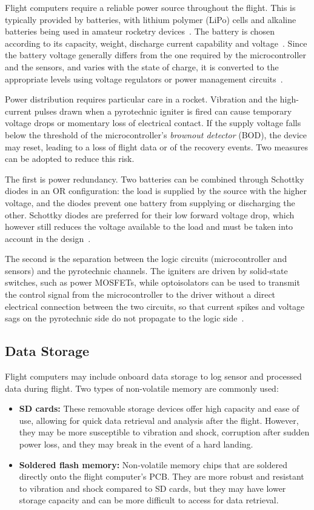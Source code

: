 Flight computers require a reliable power source throughout the flight. This is typically provided by batteries, with lithium polymer (LiPo) cells and alkaline batteries being used in amateur rocketry devices~\cite{altus:telemetrum,featherweight:blueraven}. The battery is chosen according to its capacity, weight, discharge current capability and voltage~\cite{reddy2011linden}. Since the battery voltage generally differs from the one required by the microcontroller and the sensors, and varies with the state of charge, it is converted to the appropriate levels using voltage regulators or power management circuits~\cite{horowitz2015art}.

Power distribution requires particular care in a rocket. Vibration and the high-current pulses drawn when a pyrotechnic igniter is fired can cause temporary voltage drops or momentary loss of electrical contact. If the supply voltage falls below the threshold of the microcontroller's \emph{brownout detector} (BOD), the device may reset, leading to a loss of flight data or of the recovery events. Two measures can be adopted to reduce this risk.

The first is power redundancy. Two batteries can be combined through Schottky diodes in an OR configuration: the load is supplied by the source with the higher voltage, and the diodes prevent one battery from supplying or discharging the other. Schottky diodes are preferred for their low forward voltage drop, which however still reduces the voltage available to the load and must be taken into account in the design~\cite{horowitz2015art}.

The second is the separation between the logic circuits (microcontroller and sensors) and the pyrotechnic channels. The igniters are driven by solid-state switches, such as power MOSFETs, while optoisolators can be used to transmit the control signal from the microcontroller to the driver without a direct electrical connection between the two circuits, so that current spikes and voltage sags on the pyrotechnic side do not propagate to the logic side~\cite{horowitz2015art}.

\subsection{Data Storage} 

Flight computers may include onboard data storage to log sensor and processed data during flight. Two types of non-volatile memory are commonly used:
\begin{itemize}
    \item \textbf{SD cards:} These removable storage devices offer high capacity and ease of use, allowing for quick data retrieval and analysis after the flight. However, they may be more susceptible to vibration and shock, corruption after sudden power loss, and they may break in the event of a hard landing.
    \item \textbf{Soldered flash memory:} Non-volatile memory chips that are soldered directly onto the flight computer's PCB. They are more robust and resistant to vibration and shock compared to SD cards, but they may have lower storage capacity and can be more difficult to access for data retrieval.
\end{itemize}

